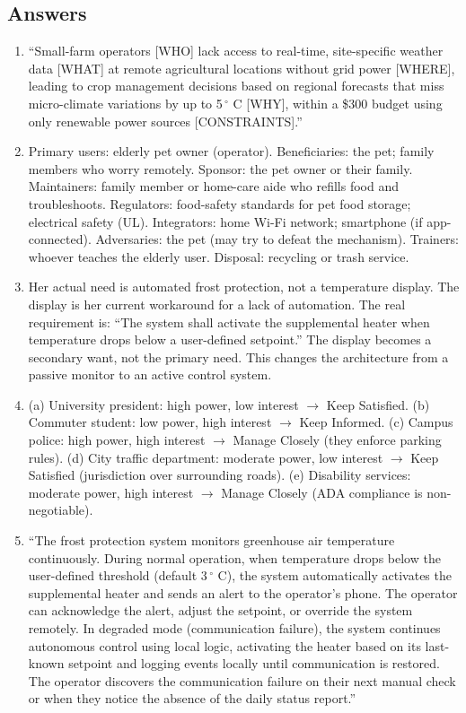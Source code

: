 \subsection{Answers}
\begin{enumerate}[leftmargin=1.5em]
\item ``Small-farm operators [WHO] lack access to real-time, site-specific weather data [WHAT] at remote agricultural locations without grid power [WHERE], leading to crop management decisions based on regional forecasts that miss micro-climate variations by up to 5\,$^{\circ}$ C [WHY], within a \$300 budget using only renewable power sources [CONSTRAINTS].''
\item Primary users: elderly pet owner (operator). Beneficiaries: the pet; family members who worry remotely. Sponsor: the pet owner or their family. Maintainers: family member or home-care aide who refills food and troubleshoots. Regulators: food-safety standards for pet food storage; electrical safety (UL). Integrators: home Wi-Fi network; smartphone (if app-connected). Adversaries: the pet (may try to defeat the mechanism). Trainers: whoever teaches the elderly user. Disposal: recycling or trash service.
\item Her actual need is automated frost protection, not a temperature display. The display is her current workaround for a lack of automation. The real requirement is: ``The system shall activate the supplemental heater when temperature drops below a user-defined setpoint.'' The display becomes a secondary want, not the primary need. This changes the architecture from a passive monitor to an active control system.
\item (a) University president: high power, low interest $\to$ Keep Satisfied. (b) Commuter student: low power, high interest $\to$ Keep Informed. (c) Campus police: high power, high interest $\to$ Manage Closely (they enforce parking rules). (d) City traffic department: moderate power, low interest $\to$ Keep Satisfied (jurisdiction over surrounding roads). (e) Disability services: moderate power, high interest $\to$ Manage Closely (ADA compliance is non-negotiable).
\item ``The frost protection system monitors greenhouse air temperature continuously. During normal operation, when temperature drops below the user-defined threshold (default 3\,$^{\circ}$ C), the system automatically activates the supplemental heater and sends an alert to the operator's phone. The operator can acknowledge the alert, adjust the setpoint, or override the system remotely. In degraded mode (communication failure), the system continues autonomous control using local logic, activating the heater based on its last-known setpoint and logging events locally until communication is restored. The operator discovers the communication failure on their next manual check or when they notice the absence of the daily status report.''

\end{enumerate}
